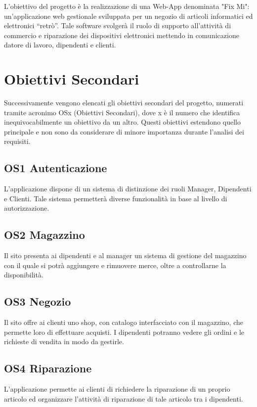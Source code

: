 \documentclass{report}
\begin{document}
L’obiettivo del progetto è la realizzazione di una Web-App denominata "Fix Mi": un'applicazione web gestionale sviluppata per un negozio di articoli informatici ed elettronici “retrò”. Tale software svolgerà il ruolo di supporto all’attività di commercio e riparazione dei dispositivi elettronici mettendo in comunicazione datore di lavoro, dipendenti e clienti.


\section{Obiettivi Secondari}

Successivamente vengono elencati gli obiettivi secondari del progetto, numerati tramite acronimo OSx (Obiettivi Secondari), dove x è il numero che identifica inequivocabilmente un obiettivo da un altro. Questi obiettivi estendono quello principale e non sono da considerare di minore importanza durante l’analisi dei requisiti.


\subsection*{OS1 Autenticazione}
L’applicazione dispone di un sistema di distinzione dei ruoli Manager, Dipendenti e Clienti. Tale sistema permetterà diverse funzionalità in base al livello di autorizzazione.



\subsection*{OS2 Magazzino}
Il sito presenta ai dipendenti e al manager un sistema di gestione del magazzino con il quale si potrà aggiungere e rimuovere merce, oltre a controllarne la disponibilità.


\subsection*{OS3 Negozio}
Il sito offre ai clienti uno shop, con catalogo interfacciato con il magazzino, che permette loro di effettuare acquisti. I dipendenti potranno vedere gli ordini e le richieste di vendita in modo da gestirle.


\subsection*{OS4 Riparazione}
L’applicazione permette ai clienti di richiedere la riparazione di un proprio articolo ed organizzare l’attività di riparazione di tale articolo tra i dipendenti.
\end{document}

